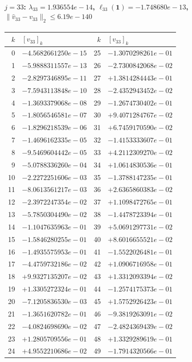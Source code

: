 \documentclass[11pt]{article}
\begin{document}
\paragraph{$j = 33$: $\lambda_{33} = 1.936554e-14$, \quad $\ell_{33}(\mathbf{1}) = -1.748680e-13$, \quad $\|\hat{v}_{33} - v_{33}\|_2 \leq 6.19e-140$}
\begin{center}
{\footnotesize
\begin{tabular}{r@{\;\;}l@{\quad}r@{\;\;}l}
\toprule
$k$ & $[v_{33}]_k$ & $k$ & $[v_{33}]_k$ \\
\midrule
0 & $-4.5682661250e-15$ & 25 & $-1.3070298261e-01$ \\
1 & $-5.9888311557e-13$ & 26 & $-2.7300842068e-02$ \\
2 & $-2.8297346895e-11$ & 27 & $+1.3814284443e-01$ \\
3 & $-7.5943113848e-10$ & 28 & $-2.4352943452e-02$ \\
4 & $-1.3693379068e-08$ & 29 & $-1.2674730402e-01$ \\
5 & $-1.8056546581e-07$ & 30 & $+9.4071284767e-02$ \\
6 & $-1.8296218539e-06$ & 31 & $+6.7459170590e-02$ \\
7 & $-1.4696162335e-05$ & 32 & $-1.4153333607e-01$ \\
8 & $-9.5469604442e-05$ & 33 & $+4.2112309270e-02$ \\
9 & $-5.0788336260e-04$ & 34 & $+1.0614830536e-01$ \\
10 & $-2.2272251606e-03$ & 35 & $-1.3788147235e-01$ \\
11 & $-8.0613561217e-03$ & 36 & $+2.6365860383e-02$ \\
12 & $-2.3972247354e-02$ & 37 & $+1.1098472765e-01$ \\
13 & $-5.7850304490e-02$ & 38 & $-1.4478723394e-01$ \\
14 & $-1.1047635963e-01$ & 39 & $+5.0691297731e-02$ \\
15 & $-1.5846280255e-01$ & 40 & $+8.6016655521e-02$ \\
16 & $-1.4935575953e-01$ & 41 & $-1.5522026481e-01$ \\
17 & $-4.4759732186e-02$ & 42 & $+1.0906716958e-01$ \\
18 & $+9.9327135207e-02$ & 43 & $+1.3312093394e-02$ \\
19 & $+1.3305272324e-01$ & 44 & $-1.2574175373e-01$ \\
20 & $-7.1205836530e-03$ & 45 & $+1.5752926423e-01$ \\
21 & $-1.3651620782e-01$ & 46 & $-9.3819263091e-02$ \\
22 & $-4.0824698690e-02$ & 47 & $-2.4824369439e-02$ \\
23 & $+1.2805709556e-01$ & 48 & $+1.3329289619e-01$ \\
24 & $+4.9552210686e-02$ & 49 & $-1.7914320566e-01$ \\
\bottomrule
\end{tabular}
}
\end{center}
\end{document}
